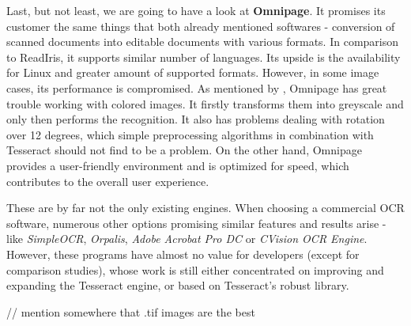 Last, but not least, we are going to have a look at \textbf{Omnipage}. It promises its customer the same things that both already mentioned softwares - conversion of scanned documents into editable documents with various formats. In comparison to ReadIris, it supports similar number of languages. Its upside is the availability for Linux and greater amount of supported formats. However, in some image cases, its performance is compromised. As mentioned by \citet{omnipageTest}, Omnipage has great trouble working with colored images. It firstly transforms them into greyscale and only then performs the recognition. It also has problems dealing with rotation over 12 degrees, which simple preprocessing algorithms in combination with Tesseract should not find to be a problem. On the other hand, Omnipage provides a user-friendly environment and is optimized for speed, which contributes to the overall user experience.

These are by far not the only existing engines. When choosing a commercial OCR software, numerous other options promising similar features and results arise - like \emph{SimpleOCR}, \emph{Orpalis}, \emph{Adobe Acrobat Pro DC} or \emph{CVision OCR Engine}. However, these programs have almost no value for developers (except for comparison studies), whose work is still either concentrated on improving and expanding the Tesseract engine, or based on Tesseract's robust library.

// mention somewhere that .tif images are the best 
